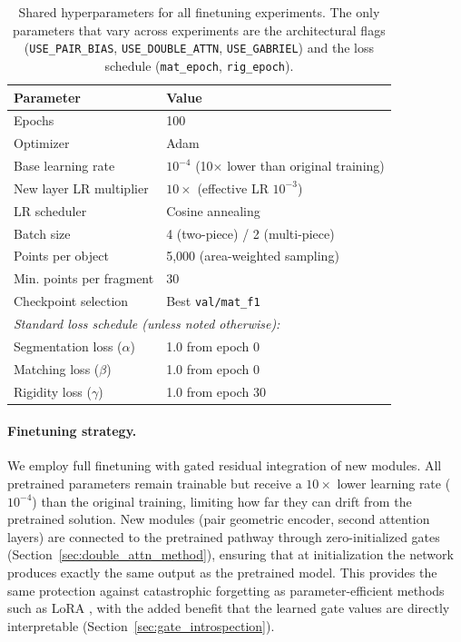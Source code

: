 \begin{table}[h]
\centering
\caption{Shared hyperparameters for all finetuning experiments. The only parameters that vary across experiments are the architectural flags (\texttt{USE\_PAIR\_BIAS}, \texttt{USE\_DOUBLE\_ATTN}, \texttt{USE\_GABRIEL}) and the loss schedule (\texttt{mat\_epoch}, \texttt{rig\_epoch}).}
\label{tab:hyperparams}
\begin{tabular}{ll}
\toprule
\textbf{Parameter} & \textbf{Value} \\
\midrule
Epochs & 100 \\
Optimizer & Adam \\
Base learning rate & $10^{-4}$ (10$\times$ lower than original training) \\
New layer LR multiplier & $10\times$ (effective LR $10^{-3}$) \\
LR scheduler & Cosine annealing \\
Batch size & 4 (two-piece) / 2 (multi-piece) \\
Points per object & 5,000 (area-weighted sampling) \\
Min. points per fragment & 30 \\
Checkpoint selection & Best \texttt{val/mat\_f1} \\
\midrule
\multicolumn{2}{l}{\textit{Standard loss schedule (unless noted otherwise):}} \\
Segmentation loss ($\alpha$) & 1.0 from epoch 0 \\
Matching loss ($\beta$) & 1.0 from epoch 0 \\
Rigidity loss ($\gamma$) & 1.0 from epoch 30 \\
\bottomrule
\end{tabular}
\end{table}

\paragraph{Finetuning strategy.}
We employ full finetuning with gated residual integration of new modules. All pretrained parameters remain trainable but receive a $10\times$ lower learning rate ($10^{-4}$) than the original training, limiting how far they can drift from the pretrained solution. New modules (pair geometric encoder, second attention layers) are connected to the pretrained pathway through zero-initialized gates (Section~\ref{sec:double_attn_method}), ensuring that at initialization the network produces exactly the same output as the pretrained model. This provides the same protection against catastrophic forgetting as parameter-efficient methods such as LoRA \cite{hu2022lora}, with the added benefit that the learned gate values are directly interpretable (Section~\ref{sec:gate_introspection}).

